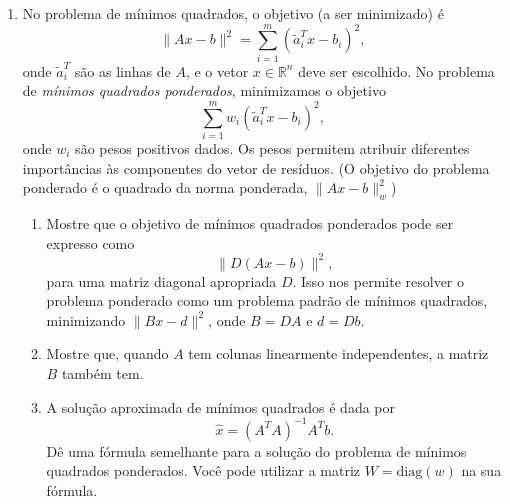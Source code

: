 \documentclass[a4paper,12pt]{article}
\begin{document}
\begin{enumerate}
    \item No problema de mínimos quadrados, o objetivo (a ser minimizado) é
\[
\|Ax - b\|^2 = \sum_{i=1}^m (\tilde{a}_i^T x - b_i)^2,
\]
onde $\tilde{a}_i^T$ são as linhas de $A$, e o vetor $x \in \mathbb{R}^n$ deve ser escolhido.  
No problema de \emph{mínimos quadrados ponderados}, minimizamos o objetivo
\[
\sum_{i=1}^m w_i (\tilde{a}_i^T x - b_i)^2,
\]
onde $w_i$ são pesos positivos dados.  
Os pesos permitem atribuir diferentes importâncias às componentes do vetor de resíduos.  
(O objetivo do problema ponderado é o quadrado da norma ponderada,
$\|Ax - b\|_w^2$)

\begin{enumerate}
    \item Mostre que o objetivo de mínimos quadrados ponderados pode ser expresso como
    \[
    \|D(Ax - b)\|^2,
    \]
    para uma matriz diagonal apropriada $D$.  
    Isso nos permite resolver o problema ponderado como um problema padrão de mínimos quadrados,  
    minimizando $\|Bx - d\|^2$, onde $B = DA$ e $d = Db$.

    \item Mostre que, quando $A$ tem colunas linearmente independentes, a matriz $B$ também tem.

    \item A solução aproximada de mínimos quadrados é dada por  
    \[
        \hat{x} = (A^T A)^{-1} A^T b.
    \]
    Dê uma fórmula semelhante para a solução do problema de mínimos quadrados ponderados.  
    Você pode utilizar a matriz $W = \mathrm{diag}(w)$ na sua fórmula.
\end{enumerate}





\end{enumerate}
\end{document}
